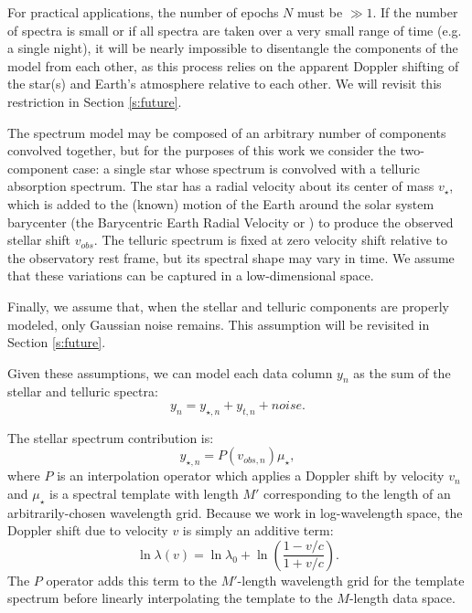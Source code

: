 \documentclass[modern]{aastex62}
\begin{document}
For practical applications, the number of epochs $N$ must be $\gg 1$. 
If the number of spectra is small or if all spectra are taken over a very small range of time (e.g. a single night), it will be nearly impossible to disentangle the components of the model from each other, as this process relies on the apparent Doppler shifting of the star(s) and Earth's atmosphere relative to each other. 
We will revisit this restriction in Section \ref{s:future}.

The spectrum model may be composed of an arbitrary number of components convolved together, but for the purposes of this work we consider the two-component case: a single star whose spectrum is convolved with a telluric absorption spectrum. 
The star has a radial velocity about its center of mass $v_{\star}$, which is added to the (known) motion of the Earth around the solar system barycenter (the Barycentric Earth Radial Velocity or \BERV ) to produce the observed stellar \RV shift $v_{obs}$. 
The telluric spectrum is fixed at zero velocity shift relative to the observatory rest frame, but its spectral shape may vary in time. 
We assume that these variations can be captured in a low-dimensional space.

Finally, we assume that, when the stellar and telluric components are properly modeled, only Gaussian noise remains. 
This assumption will be revisited in Section \ref{s:future}.

Given these assumptions, we can model each data column $y_n$ as the sum of the stellar and telluric spectra:
\begin{equation}
y_n = y_{\star, n} + y_{t, n} + noise.
\end{equation}

The stellar spectrum contribution is: 
\begin{equation}
y_{\star, n} = P(v_{obs, n}) \mu_{\star},
\end{equation}
where $P$ is an interpolation operator which applies a Doppler shift by velocity $v_n$ and $\mu_{\star}$ is a spectral template with length $M'$ corresponding to the length of an arbitrarily-chosen wavelength grid. 
Because we work in log-wavelength space, the Doppler shift due to velocity $v$ is simply an additive term:
\begin{equation}
 \ln \lambda(v) = \ln \lambda_{0} + \ln \left(\frac{1 - v/c}{1 + v/c}\right).
\end{equation}
The $P$ operator adds this term to the $M'$-length wavelength grid for the template spectrum before linearly interpolating the template to the $M$-length data space.
\end{document}
